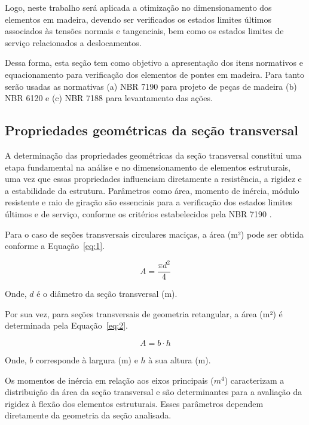 Logo, neste trabalho será aplicada a otimização no dimensionamento dos elementos em madeira, devendo ser verificados os estados limites últimos associados às tensões normais e tangenciais, bem como os estados limites de serviço relacionados a deslocamentos. 

Dessa forma, esta seção tem como objetivo a apresentação dos itens normativos e equacionamento para verificação dos elementos de pontes em madeira. Para tanto serão usadas as normativas (a) NBR 7190 \parencite{NBR7190-1:2022} para projeto de peças de madeira (b) NBR 6120 \parencite{NBR6120:2019} e (c) NBR 7188 \parencite{nbr7188} para levantamento das ações. 

\subsection{Propriedades geométricas da seção transversal}

A determinação das propriedades geométricas da seção transversal constitui uma etapa fundamental na análise e no dimensionamento de elementos estruturais, uma vez que essas propriedades influenciam diretamente a resistência, a rigidez e a estabilidade da estrutura. Parâmetros como área, momento de inércia, módulo resistente e raio de giração são essenciais para a verificação dos estados limites últimos e de serviço, conforme os critérios estabelecidos pela NBR 7190 \parencite{NBR7190-1:2022}.

Para o caso de seções transversais circulares maciças, a área (m²) pode ser obtida conforme a Equação~\eqref{eq:1}.

\begin{equation}
A = \frac{\pi d^2}{4}
\label{eq:1}
\end{equation}

Onde, \(d\) é o diâmetro da seção transversal (m).

Por sua vez, para seções transversais de geometria retangular, a área (m²) é determinada pela Equação~\eqref{eq:2}.

\begin{equation}
A = b \cdot h
\label{eq:2}
\end{equation}

Onde, \(b\) corresponde à largura (m) e \(h\) à sua altura (m).

Os momentos de inércia em relação aos eixos principais ($m^4$) caracterizam a distribuição da área da seção transversal e são determinantes para a avaliação da rigidez à flexão dos elementos estruturais. Esses parâmetros dependem diretamente da geometria da seção analisada.

